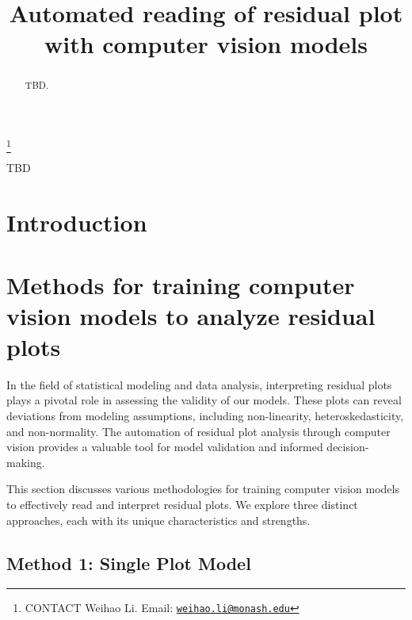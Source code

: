 \documentclass[]{interact}
\theoremstyle{plain}%
\theoremstyle{definition}
\theoremstyle{remark}
\begin{document}

\title{Automated reading of residual plot with computer vision models}


\author{
}

\thanks{CONTACT Weihao
Li. Email: \href{mailto:weihao.li@monash.edu}{\nolinkurl{weihao.li@monash.edu}}}

\maketitle

\begin{abstract}
TBD.
\end{abstract}

\begin{keywords}
TBD
\end{keywords}

\hypertarget{introduction}{%
\section{Introduction}\label{introduction}}

\hypertarget{methods-for-training-computer-vision-models-to-analyze-residual-plots}{%
\section{Methods for training computer vision models to analyze residual
plots}\label{methods-for-training-computer-vision-models-to-analyze-residual-plots}}

In the field of statistical modeling and data analysis, interpreting
residual plots plays a pivotal role in assessing the validity of our
models. These plots can reveal deviations from modeling assumptions,
including non-linearity, heteroskedasticity, and non-normality. The
automation of residual plot analysis through computer vision provides a
valuable tool for model validation and informed decision-making.

This section discusses various methodologies for training computer
vision models to effectively read and interpret residual plots. We
explore three distinct approaches, each with its unique characteristics
and strengths.

\hypertarget{method-1-single-plot-model}{%
\subsection{Method 1: Single Plot
Model}\label{method-1-single-plot-model}}
\end{document}
